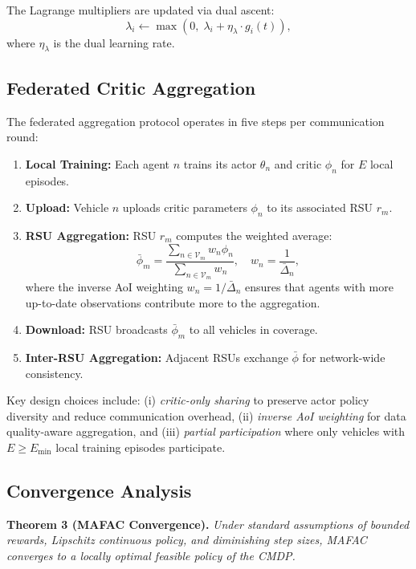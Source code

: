 \documentclass[journal]{IEEEtran}
\begin{document}
The Lagrange multipliers are updated via dual ascent:
\begin{equation} \label{eq:dual_update}
\lambda_i \leftarrow \max\left(0,\; \lambda_i + \eta_\lambda \cdot g_i(t)\right),
\end{equation}
where $\eta_\lambda$ is the dual learning rate.

\subsection{Federated Critic Aggregation} \label{subsec:3}

The federated aggregation protocol operates in five steps per communication round:

\begin{enumerate}
\item \textbf{Local Training:} Each agent $n$ trains its actor $\theta_n$ and critic $\phi_n$ for $E$ local episodes.
\item \textbf{Upload:} Vehicle $n$ uploads critic parameters $\phi_n$ to its associated RSU $r_m$.
\item \textbf{RSU Aggregation:} RSU $r_m$ computes the weighted average:
\begin{equation} \label{eq:fed_agg}
\bar{\phi}_m = \frac{\sum_{n \in \mathcal{V}_m} w_n \phi_n}{\sum_{n \in \mathcal{V}_m} w_n}, \quad w_n = \frac{1}{\bar{\Delta}_n},
\end{equation}
where the inverse AoI weighting $w_n = 1/\bar{\Delta}_n$ ensures that agents with more up-to-date observations contribute more to the aggregation.
\item \textbf{Download:} RSU broadcasts $\bar{\phi}_m$ to all vehicles in coverage.
\item \textbf{Inter-RSU Aggregation:} Adjacent RSUs exchange $\bar{\phi}$ for network-wide consistency.
\end{enumerate}

Key design choices include: (i) \emph{critic-only sharing} to preserve actor policy diversity and reduce communication overhead, (ii) \emph{inverse AoI weighting} for data quality-aware aggregation, and (iii) \emph{partial participation} where only vehicles with $E \geq E_{\min}$ local training episodes participate.

\subsection{Convergence Analysis} \label{subsec:4}

\textbf{Theorem 3 (MAFAC Convergence).} \emph{Under standard assumptions of bounded rewards, Lipschitz continuous policy, and diminishing step sizes, MAFAC converges to a locally optimal feasible policy of the CMDP.}
\end{document}

